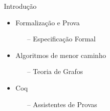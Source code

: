 \begin{frame}{Introdução}
    \begin{itemize}
        \item Formalização e Prova
        \begin{itemize}
            \item [--] Especificação Formal
        \end{itemize}
        \item Algoritmos de menor caminho
        \begin{itemize}
            \item [--] Teoria de Grafos
        \end{itemize}
        \item Coq
        \begin{itemize}
            \item [--] Assistentes de Provas
        \end{itemize}
    \end{itemize}
\end{frame}